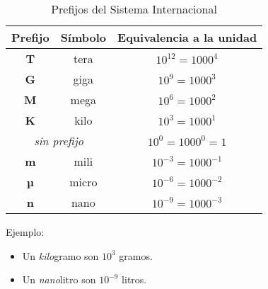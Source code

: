 \documentclass[12pt]{article}
\begin{document}
\begin{table}[h]

    \centering

    \caption{Prefijos del Sistema Internacional}
    \label{tablaPrefijoSI}

    \begin{tabular}{ | c | c | c | }
        \hline
        Prefijo & Símbolo & Equivalencia a la unidad \\
        \hline
        \textbf{T} & tera & $10^{12}=1000^{4}$ \\
        \hline
        \textbf{G} & giga & $10^{9}=1000^{3}$ \\
        \hline
        \textbf{M} & mega & $10^{6}=1000^{2}$ \\
        \hline
        \textbf{K} & kilo & $10^{3}=1000^{1}$ \\
        \hline
        \multicolumn{2}{|c|}{\emph{sin prefijo}} & $10^{0}=1000^{0}=1$ \\
        \hline
        \textbf{m} & mili & $10^{-3}=1000^{-1}$ \\
        \hline
        \textbf{µ} & micro & $10^{-6}=1000^{-2}$ \\
        \hline
        \textbf{n} & nano & $10^{-9}=1000^{-3}$ \\
        \hline
    \end{tabular}

    \vspace{2\topsep}
    Ejemplo:
    \vspace{-1\topsep}
    \begin{itemize}

        \itemsep2pt \parskip0pt 
        \item   Un \emph{kilo}gramo son $10^{3}$ gramos.
        \item   Un \emph{nano}litro son $10^{-9}$ litros.

    \end{itemize}

\end{table}
\end{document}
